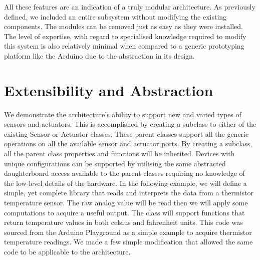 All these features are an indication of a truly modular architecture. As previously defined, we included an entire subsystem without modifying the existing components. The modules can be removed just as easy as they were installed. The level of expertise, with regard to specialised knowledge required to modify this system is also relatively minimal when compared to a generic prototyping platform like the Arduino due to the abstraction in its design.


\section{Extensibility and Abstraction} %
\label{sec:extensibility_abstraction}
We demonstrate the \xten architecture's ability to support new and varied types of sensors and actuators. This is accomplished by creating a subclass to either of the existing Sensor or Actuator classes. These parent classes support all the generic operations on all the available sensor and actuator ports. By creating a subclass, all the parent class properties and functions will be inherited. Devices with unique configurations can be supported by utilising the same abstracted daughterboard access available to the parent classes requiring no knowledge of the low-level details of the hardware.
In the following example, we will define a simple, yet complete library that reads and interprets the data from a thermistor temperature sensor. The raw analog value will be read then we will apply some computations to acquire a useful output. The class will support functions that return temperature values in both celsius and fahrenheit units. This code was sourced from the Arduino Playground \parencite{therm} as a simple example to acquire thermistor temperature readings. We made a few simple modification that allowed the same code to be applicable to the \xten architecture.
